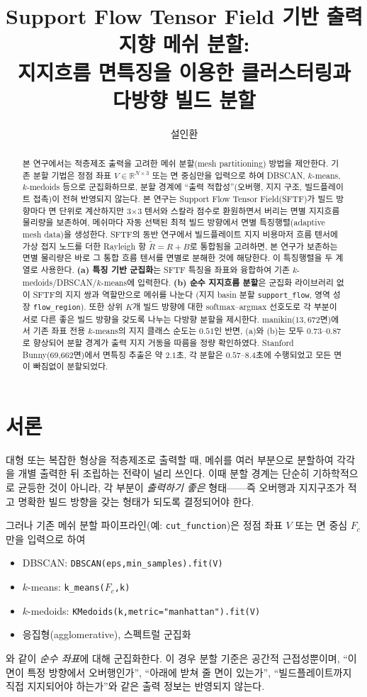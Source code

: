 \documentclass[11pt,a4paper]{article}
\title{Support Flow Tensor Field 기반 출력지향 메쉬 분할:\\
지지흐름 면특징을 이용한 클러스터링과 다방향 빌드 분할}
\author{설인환}
\date{}
\begin{document}
\maketitle

\begin{abstract}
본 연구에서는 적층제조 출력을 고려한 메쉬 분할(mesh partitioning) 방법을 제안한다.
기존 분할 기법은 정점 좌표 $V\in\mathbb{R}^{N\times3}$ 또는 면 중심만을 입력으로 하여
DBSCAN, $k$-means, $k$-medoids 등으로 군집화하므로,
분할 경계에 ``출력 적합성''(오버행, 지지 구조, 빌드플레이트 접촉)이 전혀 반영되지 않는다.
본 연구는 Support Flow Tensor Field(SFTF)가 빌드 방향마다 면 단위로 계산하지만
3$\times$3 텐서와 스칼라 점수로 환원하면서 버리는 면별 지지흐름 물리량을 보존하여,
메쉬마다 자동 선택된 최적 빌드 방향에서 면별 특징행렬(adaptive mesh data)을 생성한다.
SFTF의 동반 연구에서 빌드플레이트 지지 비용마저 흐름 텐서에 가상 접지 노드를 더한
Rayleigh 항 $\tilde R=R+B$로 통합됨을 고려하면,
본 연구가 보존하는 면별 물리량은 바로 그 통합 흐름 텐서를 면별로 분해한 것에 해당한다.
이 특징행렬을 두 계열로 사용한다.
\textbf{(a) 특징 기반 군집화}는 SFTF 특징을 좌표와 융합하여
기존 $k$-medoids/DBSCAN/$k$-means에 입력한다.
\textbf{(b) 순수 지지흐름 분할}은 군집화 라이브러리 없이
SFTF의 지지 쌍과 역할만으로 메쉬를 나눈다
(지지 basin 분할 \texttt{support\_flow}, 영역 성장 \texttt{flow\_region}).
또한 상위 $K$개 빌드 방향에 대한 softmax--argmax 선호도로
각 부분이 서로 다른 좋은 빌드 방향을 갖도록 나누는 다방향 분할을 제시한다.
manikin($13{,}672$면)에서 기존 좌표 전용 $k$-means의 지지 클래스 순도는 $0.51$인 반면,
(a)와 (b)는 모두 $0.73$--$0.87$로 향상되어 분할 경계가 출력 지지 거동을 따름을 정량 확인하였다.
Stanford Bunny(69{,}662면)에서 면특징 추출은 약 $2.1$초,
각 분할은 $0.57$--$8.4$초에 수행되었고 모든 면이 빠짐없이 분할되었다.
\end{abstract}

\section{서론}

대형 또는 복잡한 형상을 적층제조로 출력할 때, 메쉬를 여러 부분으로 분할하여
각각을 개별 출력한 뒤 조립하는 전략이 널리 쓰인다.
이때 분할 경계는 단순히 기하학적으로 균등한 것이 아니라,
각 부분이 \emph{출력하기 좋은} 형태——즉 오버행과 지지구조가 적고
명확한 빌드 방향을 갖는 형태가 되도록 결정되어야 한다.

그러나 기존 메쉬 분할 파이프라인(예: \texttt{cut\_function})은
정점 좌표 $V$ 또는 면 중심 $F_c$만을 입력으로 하여
\begin{itemize}
\item DBSCAN: \texttt{DBSCAN(eps,min\_samples).fit(V)}
\item $k$-means: \texttt{k\_means(}$F_c$\texttt{,k)}
\item $k$-medoids: \texttt{KMedoids(k,metric="manhattan").fit(V)}
\item 응집형(agglomerative), 스펙트럴 군집화
\end{itemize}
와 같이 \emph{순수 좌표}에 대해 군집화한다.
이 경우 분할 기준은 공간적 근접성뿐이며,
``이 면이 특정 방향에서 오버행인가'', ``아래에 받쳐 줄 면이 있는가'',
``빌드플레이트까지 직접 지지되어야 하는가''와 같은 출력 정보는 반영되지 않는다.
\end{document}
